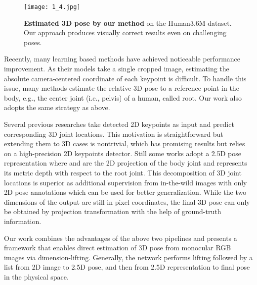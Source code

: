 \documentclass[letterpaper]{article} \usepackage{aaai21}  \usepackage{times}  \usepackage{helvet} \usepackage{courier}  \usepackage[hyphens]{url}  \usepackage{graphicx} \urlstyle{rm} \def\UrlFont{\rm}  \usepackage{natbib}  \usepackage{caption} \frenchspacing  \setlength{\pdfpagewidth}{8.5in}  \setlength{\pdfpageheight}{11in}
\begin{document}
\begin{figure}[ht]
\centering
\texttt{[image: 1\_4.jpg]} \caption{\textbf{Estimated 3D pose by our method }on the Human3.6M dataset. Our approach produces visually correct results even on challenging poses.}
\label{fig1}
\end{figure}

Recently, many learning based methods \cite{martinez2017simple,pavlakos2017coarse,sun2017compositional,sun2018integral,yang20183d} have achieved noticeable performance improvement. As their models take a single cropped image, estimating the absolute camera-centered coordinate of each keypoint is difficult. To handle this issue, many methods estimate the relative 3D pose to a reference point in the body, e.g., the center joint (i.e., pelvis) of a human, called root. Our work also adopts the same strategy as above. 

Several previous researches \cite{moreno20173d,martinez2017simple,wang2019not,sharma2019monocular} take detected 2D keypoints as input and predict corresponding 3D joint locations. This motivation is straightforward but extending them to 3D cases is nontrivial, which has promising results but relies on a high-precision 2D keypoints detector. Still some works \cite{pavlakos2018ordinal,sun2018integral,zhou2019hemlets} adopt a 2.5D pose representation  where  and  are the 2D projection of the body joint  and  represents its metric depth with respect to the root joint. This decomposition of 3D joint locations is superior as additional supervision from in-the-wild images with only 2D pose annotations which can be used for better generalization. While the two dimensions of the output are still in pixel coordinates, the final 3D pose can only be obtained by projection transformation with the help of ground-truth information. 

Our work combines the advantages of the above two pipelines and presents a framework that enables direct estimation of 3D pose from monocular RGB images via dimension-lifting. Generally, the network performs lifting followed by a list from 2D image to 2.5D pose, and then from 2.5D representation to final pose in the physical space.
\end{document}
